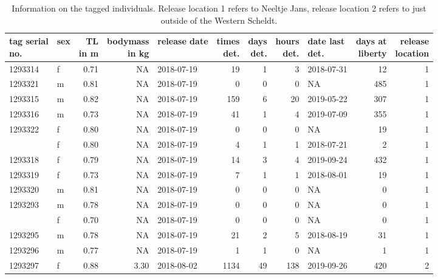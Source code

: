 \documentclass[
  authoryear,
  review,
  3p]{elsarticle}
\begin{document}
\begin{table}[H]
\caption{\label{tbl-animalinfo}Information on the tagged individuals. Release location 1 refers to
Neeltje Jans, release location 2 refers to just outside of the Western
Scheldt. }\tabularnewline

\centering
\begin{tabular}{llrrlrrrlrr}
\toprule
\makecell[c]{tag serial\\no.} & sex & \makecell[c]{TL\\ in m} & \makecell[c]{bodymass\\ in kg} & release date & \makecell[c]{times\\det.} & \makecell[c]{days\\det.} & \makecell[c]{hours\\det.} & \makecell[c]{date last\\det.} & \makecell[c]{days at\\liberty} & \makecell[c]{release\\location}\\
\midrule
1293314 & f & 0.71 & NA & 2018-07-19 & 19 & 1 & 3 & 2018-07-31 & 12 & 1\\
1293321 & m & 0.81 & NA & 2018-07-19 & 0 & 0 & 0 & NA & 485 & 1\\
1293315 & m & 0.82 & NA & 2018-07-19 & 159 & 6 & 20 & 2019-05-22 & 307 & 1\\
1293316 & m & 0.73 & NA & 2018-07-19 & 41 & 1 & 4 & 2019-07-09 & 355 & 1\\
1293322 & f & 0.80 & NA & 2018-07-19 & 0 & 0 & 0 & NA & 19 & 1\\
\addlinespace
1293317 & f & 0.80 & NA & 2018-07-19 & 4 & 1 & 1 & 2018-07-21 & 2 & 1\\
1293318 & f & 0.79 & NA & 2018-07-19 & 14 & 3 & 4 & 2019-09-24 & 432 & 1\\
1293319 & f & 0.73 & NA & 2018-07-19 & 7 & 1 & 1 & 2018-08-01 & 19 & 1\\
1293320 & m & 0.81 & NA & 2018-07-19 & 0 & 0 & 0 & NA & 0 & 1\\
1293293 & m & 0.78 & NA & 2018-07-19 & 0 & 0 & 0 & NA & 0 & 1\\
\addlinespace
1293294 & f & 0.70 & NA & 2018-07-19 & 0 & 0 & 0 & NA & 0 & 1\\
1293295 & m & 0.78 & NA & 2018-07-19 & 21 & 2 & 5 & 2018-08-19 & 31 & 1\\
1293296 & m & 0.77 & NA & 2018-07-19 & 1 & 1 & 0 & NA & 1 & 1\\
1293297 & f & 0.88 & 3.30 & 2018-08-02 & 1134 & 49 & 138 & 2019-09-26 & 420 & 2\\

\end{tabular}
\end{table}
\end{document}
